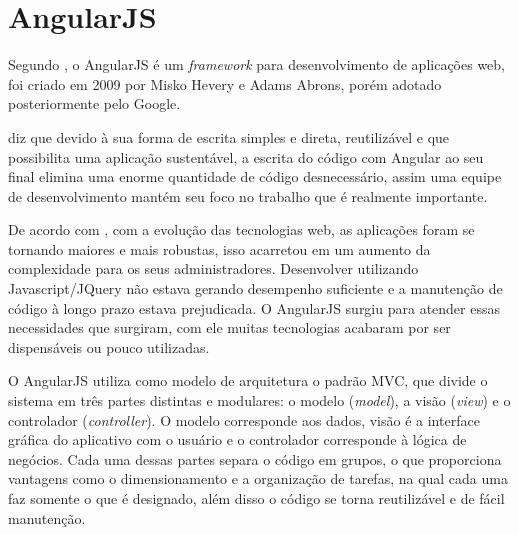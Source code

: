 \section{AngularJS}
	\par Segundo , o AngularJS é um \textit{framework} para desenvolvimento de aplicações web, foi criado em 2009 por Misko Hevery e Adams Abrons, porém adotado posteriormente pelo Google.
	\par {} diz que devido à sua forma de escrita simples e direta, reutilizável e que possibilita uma aplicação sustentável, a escrita do código com Angular ao seu final elimina uma enorme quantidade de código desnecessário, assim uma equipe de desenvolvimento mantém seu foco no trabalho que é realmente importante.
	\par De acordo com , com a evolução das tecnologias web, as aplicações foram se tornando maiores e mais robustas, isso acarretou em um aumento da complexidade para os seus administradores. Desenvolver utilizando Javascript/JQuery não estava gerando desempenho suficiente e a manutenção de código à longo prazo estava prejudicada. O AngularJS surgiu para atender essas necessidades que surgiram, com ele muitas tecnologias acabaram por ser dispensáveis ou pouco utilizadas.
	\par O AngularJS utiliza como modelo de arquitetura o padrão MVC, que divide o sistema em três partes distintas e modulares: o modelo (\textit{model}), a visão (\textit{view}) e o controlador (\textit{controller}). O modelo corresponde aos dados, visão é a interface gráfica do aplicativo com o usuário e o controlador corresponde à lógica de negócios. Cada uma dessas partes separa o código em grupos, o que proporciona vantagens como o dimensionamento e a organização de tarefas, na qual cada uma faz somente o que é designado, além disso o código se torna reutilizável e de fácil manutenção. 
	
